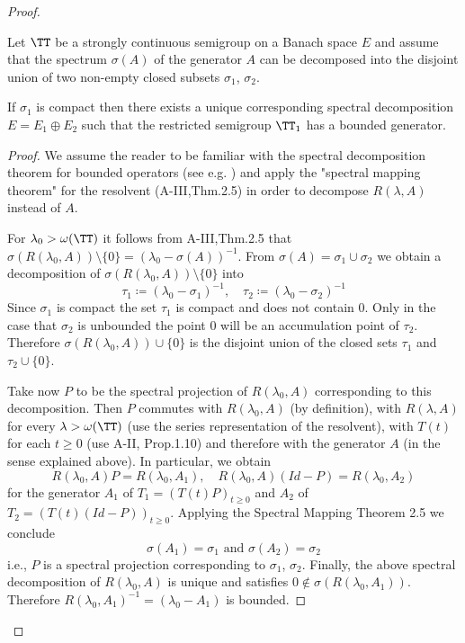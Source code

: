 \begin{proof}
\begin{theorem}\label{thm:a3-3.3}

Let $\TT$ be a strongly continuous semigroup on a Banach space $E$ and assume that the spectrum $\sigma(A)$ of the generator $A$ can be decomposed into the disjoint union of two non-empty closed subsets $\sigma_{1}$, $\sigma_{2}$.

If $\sigma_{1}$ is compact then there exists a unique corresponding spectral decomposition $E = E_{1} \oplus E_{2}$ such that the restricted semigroup $\TT_{1}$ has a bounded generator.
\end{theorem}

\begin{proof}
We assume the reader to be familiar with the spectral decomposition theorem for bounded operators (see e.g. \citet[p.572]{dunfordschwartz:1958}) and apply the "spectral mapping theorem" for the resolvent (A-III,Thm.2.5) in order to decompose $R(\lambda,A)$ instead of $A$.

For $\lambda_{0} > \omega(\TT)$ it follows from A-III,Thm.2.5 that $\sigma(R(\lambda_{0},A)) \setminus \{0\} = (\lambda_{0} - \sigma(A))^{-1}$.
From $\sigma(A) = \sigma_{1} \cup \sigma_{2}$ we obtain a decomposition of $\sigma(R(\lambda_{0},A)) \setminus \{0\}$ into
\[
\tau_{1} \coloneqq (\lambda_{0}-\sigma_{1})^{-1}, \quad \tau_{2} \coloneqq (\lambda_{0}-\sigma_{2})^{-1}
\]
Since $\sigma_{1}$ is compact the set $\tau_{1}$ is compact and does not contain $0$.
Only in the case that $\sigma_{2}$ is unbounded the point $0$ will be an accumulation point of $\tau_{2}$.
Therefore $\sigma(R(\lambda_{0},A)) \cup \{0\}$ is the disjoint union of the closed sets $\tau_{1}$ and $\tau_{2} \cup \{0\}$.

Take now $P$ to be the spectral projection of $R(\lambda_{0},A)$ corresponding to this decomposition.
Then $P$ commutes with $R(\lambda_{0},A)$ (by definition), with $R(\lambda,A)$ for every $\lambda > \omega(\TT)$ (use the series representation of the resolvent), with $T(t)$ for each $t \geq 0$ (use A-II, Prop.1.10) and therefore with the generator $A$ (in the sense explained above).
In particular, we obtain
\[
R(\lambda_{0},A)P = R(\lambda_{0},A_{1}), \quad R(\lambda_{0},A)(Id-P) = R(\lambda_{0},A_{2})
\]
for the generator $A_{1}$ of $T_{1} = (T(t)P)_{t \geq 0}$ and $A_{2}$ of $T_{2} = (T(t)(Id-P))_{t \geq 0}$.
Applying the Spectral Mapping Theorem 2.5 we conclude
\[
\sigma(A_{1}) = \sigma_{1} \text{ and } \sigma(A_{2}) = \sigma_{2}
\]
i.e., $P$ is a spectral projection corresponding to $\sigma_{1}$, $\sigma_{2}$.
Finally, the above spectral decomposition of $R(\lambda_{0},A)$ is unique and satisfies $0 \notin \sigma(R(\lambda_{0},A_{1}))$.
Therefore $R(\lambda_{0},A_{1})^{-1} = (\lambda_{0}-A_{1})$ is bounded.
\end{proof}



\end{proof}
